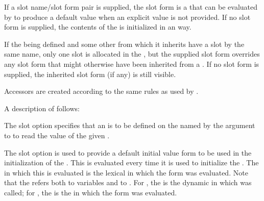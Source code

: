   If a slot name/slot form pair is supplied,
the slot form is a  that 
can be evaluated by  to
  produce a default value when an explicit value is not provided.  If no 
slot form
is supplied, the contents of the  
is initialized in an 
   way.  

  If the  being defined and some other 
 from which it inherits
  have a slot by the same name, only one slot is allocated in the
  , 
but the supplied slot form overrides any slot form
  that might otherwise have been inherited from a .  If no 
slot form is supplied, the inherited slot form (if any) is still visible.


Accessors are created according to the same rules as used by 
.

A description of  follows:



\beginlist
   

The  slot option specifies that an  is
to be defined on the  named by the argument
to  to read the value of the given .
 

\itemitem{\bull} The  slot option is used to provide a default
initial value form to be used in the initialization of the .  This
 is evaluated every time it is used to initialize the 
.  The
in which this  is evaluated is the lexical
 in which the  
form was evaluated.
Note that the  refers both to variables and to
.  
For , the  is the dynamic
in which  was called; for 
, the  
is the  in which the
 form was evaluated.  
 
